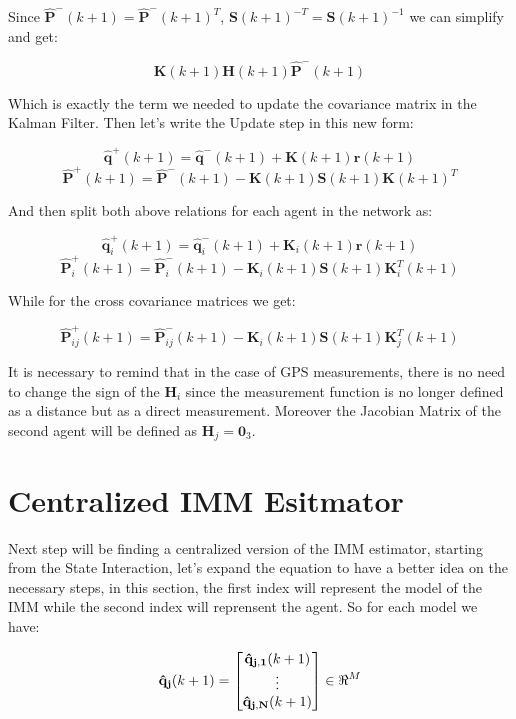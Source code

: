 \documentclass[conference]{IEEEtran}
\begin{document}
Since $\mathbf{\hat{P}^{-}}(k+1)= \mathbf{\hat{P}^{-}}(k+1)^{T}$, $\mathbf{S}(k+1)^{-T} = \mathbf{S}(k+1)^{-1}$ we can simplify and get:

$$  \mathbf{K}(k+1)\mathbf{H}(k+1) \mathbf{\hat{P}}^{-}(k+1) $$

Which is exactly the term we needed to update the covariance matrix in the Kalman Filter. Then let's write the Update step in this new form:

$$ \mathbf{\hat{q}}^{+}(k+1) = \mathbf{\hat{q}}^{-}(k+1) + \mathbf{K}(k+1)\mathbf{r}(k+1) $$
$$\mathbf{ \hat{P}}^{+}(k+1) = \mathbf{\hat{P}}^{-}(k+1) -  \mathbf{K}(k+1)\mathbf{S}(k+1) \mathbf{K}(k+1)^{T} $$

And then split both above relations for each agent in the network as:


$$ \mathbf{\hat{q}}_{i}^{+}(k+1) = \mathbf{\hat{q}}_{i}^{-}(k+1) + \mathbf{K}_{i}(k+1)\mathbf{r}(k+1) $$
$$\mathbf{ \hat{P}}_{i}^{+}(k+1) = \mathbf{\hat{P}}_{i}^{-}(k+1) -  \mathbf{K}_{i}(k+1)\mathbf{S}(k+1) \mathbf{K}_{i}^{T}(k+1) $$

While for the cross covariance matrices we get:

$$\mathbf{\hat{ P}}_{ij}^{+}(k+1) = \mathbf{\hat{P}}_{ij}^{-}(k+1) -  \mathbf{K}_{i}(k+1)\mathbf{S}(k+1) \mathbf{K}_{j}^{T}(k+1)$$

It is necessary to remind that in the case of GPS measurements, there is no need to change the sign of the $ \mathbf{H}_{i} $ since the measurement function is no longer defined as a distance but as a direct measurement. Moreover the Jacobian Matrix of the second agent will be defined as $ \mathbf{H}_{j}= \mathbf{0}_{3} $.

\section{Centralized IMM Esitmator}

Next step will be finding a centralized version of the IMM estimator, starting from the State Interaction, let's expand the equation to have a better idea on the necessary steps, in this section, the first index will represent the model of the IMM while the second index will reprensent the agent. So for each model we have:

$$  \mathbf{\hat{q}_{j}}(k+1) = \begin{bmatrix} \mathbf{\hat{q}_{j,1}}(k+1) \\ \vdots \\ \mathbf{\hat{q}_{j,N}}(k+1) \end{bmatrix} \in \real^{M}$$
\end{document}
